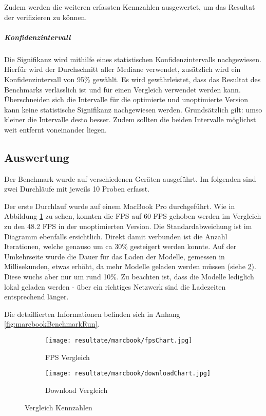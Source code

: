 Zudem werden die weiteren erfassten Kennzahlen ausgewertet, um das Resultat der  verifizieren zu können.

\subparagraph{Konfidenzintervall}
Die Signifikanz wird mithilfe eines statistischen Konfidenzintervalls nachgewiesen. Hierfür wird der Durchschnitt aller Mediane verwendet, zusätzlich wird ein Konfidenzintervall von 95\% gewählt. Es wird gewährleistet, dass das Resultat des Benchmarks verlässlich ist und für einen Vergleich verwendet werden kann. Überschneiden sich die Intervalle für die optimierte und unoptimierte Version kann keine statistische Signifikanz nachgewiesen werden. Grundsätzlich gilt: umso kleiner die Intervalle desto besser. Zudem sollten die beiden Intervalle möglichst weit entfernt voneinander liegen.

\subsection{Auswertung}
\label{chap:benchmarkResults}

Der Benchmark wurde auf verschiedenen Geräten ausgeführt. Im folgenden sind zwei Durchläufe mit jeweils 10 Proben erfasst.

Der erste Durchlauf wurde auf einem MacBook Pro durchgeführt. Wie in Abbildung \ref{fig:benchmarkFpsChartMarcbook} zu sehen, konnten die FPS auf 60 FPS gehoben werden im Vergleich zu den 48.2 FPS in der unoptimierten Version. Die Standardabweichung ist im Diagramm ebenfalls ersichtlich.
Direkt damit verbunden ist die Anzahl  Iterationen, welche genauso um ca 30\% gesteigert werden konnte. Auf der Umkehrseite wurde die Dauer für das Laden der Modelle, gemessen in Millisekunden, etwas erhöht, da mehr Modelle geladen werden müssen (siehe \ref{fig:benchmarkDownloadChartMarcbook}). Diese wuchs aber nur um rund 10\%. Zu beachten ist, dass die Modelle lediglich lokal geladen werden - über ein richtiges Netzwerk sind die Ladezeiten entsprechend länger.

Die detaillierten Informationen befinden sich in Anhang \ref{fig:marcbookBenchmarkRun}.

\begin{figure}[H]
  \centering
  \begin{subfigure}{.49\textwidth}
    \centering
    \texttt{[image: resultate/marcbook/fpsChart.jpg]}
    \caption{FPS Vergleich}
    \label{fig:benchmarkFpsChartMarcbook}
  \end{subfigure}
  \begin{subfigure}{.49\textwidth}
    \centering
    \texttt{[image: resultate/marcbook/downloadChart.jpg]}
    \caption{Download Vergleich}
    \label{fig:benchmarkDownloadChartMarcbook}
  \end{subfigure}
  \caption{Vergleich Kennzahlen}
  \label{fig:benchmarkChartMarcbook}
\end{figure}

